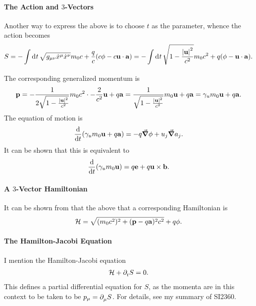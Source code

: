 \paragraph{The Action and $3$-Vectors}
Another way to express the above is to choose $t$ as the parameter, whence the action becomes
\begin{align*}
	S = -\int\limits_{}^{}\dd[]{t}\sqrt{g_{\mu\nu}\dot{x}^{\mu}\dot{x}^{\nu}}m_{0}c + \frac{q}{c}(c\phi - c\vb{u}\cdot\vb{a}) = -\int\limits_{}^{}\dd[]{t}\sqrt{1 - \frac{\abs{\vb{u}}^{2}}{c^{2}}}m_{0}c^{2} + q(\phi - \vb{u}\cdot\vb{a}).
\end{align*}
The corresponding generalized momentum is
\begin{align*}
	\vb{p} = -\frac{1}{2\sqrt{1 - \frac{\abs{\vb{u}}^{2}}{c^{2}}}}m_{0}c^{2}\cdot -\frac{2}{c^{2}}\vb{u} + q\vb{a} = \frac{1}{\sqrt{1 - \frac{\abs{\vb{u}}^{2}}{c^{2}}}}m_{0}\vb{u} + q\vb{a} = \gamma_{u}m_{0}\vb{u} + q\vb{a}.
\end{align*}
The equation of motion is
\begin{align*}
	\dv{t}(\gamma_{u}m_{0}\vb{u} + q\vb{a}) = -q\grad{\phi} + u_{j}\grad{a_{j}}.
\end{align*}
It can be shown that this is equivalent to
\begin{align*}
	\dv{t}(\gamma_{u}m_{0}\vb{u}) = q\vb{e} + q\vb{u}\times\vb{b}.
\end{align*}

\paragraph{A $3$-Vector Hamiltonian}
It can be shown from that the above that a corresponding Hamiltonian is
\begin{align*}
	\mathcal{H} = \sqrt{(m_{0}c^{2})^{2} + (\vb{p} - q\vb{a})^{2}c^{2}} + q\phi.
\end{align*}

\paragraph{The Hamilton-Jacobi Equation}
I mention the Hamilton-Jacobi equation
\begin{align*}
	\mathcal{H} + \partial^{}_{t}S = 0.
\end{align*}
This defines a partial differential equation for $S$, as the momenta are in this context to be taken to be $p_{\mu} = \partial^{}_{\mu}S$. For details, see my summary of SI2360.

